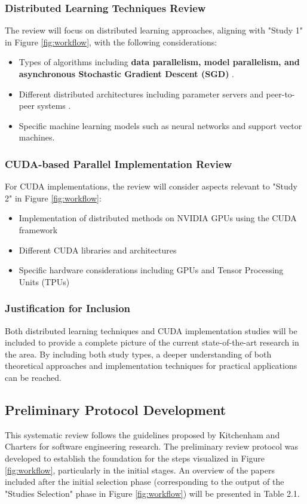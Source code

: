 \subsubsection{Distributed Learning Techniques Review}
The review will focus on distributed learning approaches, aligning with "Study 1" in Figure
\ref{fig:workflow}, with the following considerations:
\begin{itemize}
	\item Types of algorithms including \textbf{data parallelism, model parallelism, and asynchronous
		      Stochastic Gradient Descent (SGD)} \cite{ben-nun_demystifying_2020,langer_distributed_2020}.
	\item Different distributed architectures including parameter servers and peer-to-peer systems
	      \cite{verbraeken_survey_2021,ben-nun_demystifying_2020,langer_distributed_2020}.
	\item Specific machine learning models such as neural networks and support vector machines.
\end{itemize}

\subsubsection{CUDA-based Parallel Implementation Review}
For CUDA implementations, the review will consider aspects relevant to "Study 2" in Figure
\ref{fig:workflow}:
\begin{itemize}
	\item Implementation of distributed methods on NVIDIA GPUs using the CUDA framework
	\item Different CUDA libraries and architectures
	\item Specific hardware considerations including GPUs and Tensor Processing Units (TPUs)
\end{itemize}

\subsubsection{Justification for Inclusion}
Both distributed learning techniques and CUDA implementation studies will be included to provide a
complete picture of the current state-of-the-art research in the area. By including both study
types, a deeper understanding of both theoretical approaches and implementation techniques for
practical applications can be reached.

\subsection{Preliminary Protocol Development}
This systematic review follows the guidelines proposed by Kitchenham and Charters for software
engineering research. The preliminary review protocol was developed to establish the foundation for
the steps visualized in Figure \ref{fig:workflow}, particularly in the initial stages. An overview
of the papers included after the initial selection phase (corresponding to the output of the
"Studies Selection" phase in Figure \ref{fig:workflow}) will be presented in Table 2.1.

